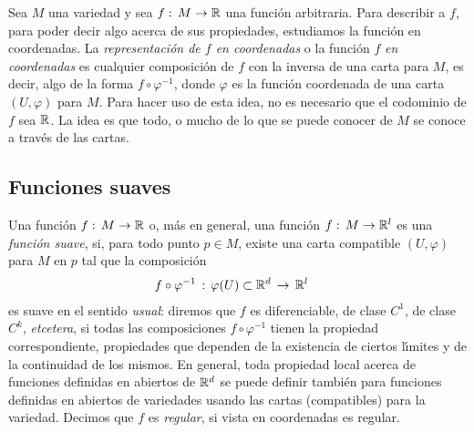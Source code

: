 \theoremstyle{plain}
\newtheorem{propoSuavidadEsLocal}{Proposici\'{o}n}[section]
\newtheorem{propoSuaveEsConti}[propoSuavidadEsLocal]{Proposici\'{o}n}
\newtheorem{propoDelPegado}[propoSuavidadEsLocal]{Proposici\'{o}n}
\newtheorem{propoAlgunasFuncionesSuaves}[propoSuavidadEsLocal]{Proposici\'{o}n}

\theoremstyle{remark}
\newtheorem{obsComoLaUsual}{Observaci\'{o}n}[section]
\newtheorem{obsTodasSonSuaves}[obsComoLaUsual]{Observaci\'{o}n}
\newtheorem{obsOtrasCaracterizacionesDeSuavidad}[obsComoLaUsual]%
	{Observaci\'{o}n}


Sea $M$ una variedad y sea $f:\,M\rightarrow\mathbb{R}$ una funci\'{o}n
arbitraria. Para describir a $f$, para poder decir algo acerca de sus
propiedades, estudiamos la funci\'{o}n en coordenadas. La
\emph{representaci\'{o}n de $f$ en coordenadas} o la funci\'{o}n $f$
\emph{en coordenadas} es cualquier composici\'{o}n de $f$ con la inversa de
una carta para $M$, es decir, algo de la forma $f\circ\varphi^{-1}$,
donde $\varphi$ es la funci\'{o}n coordenada de una carta $(U,\varphi)$
para $M$. Para hacer uso de esta idea, no es necesario que el codominio de
$f$ sea $\mathbb{R}$. La idea es que todo, o mucho de lo que se puede conocer de
$M$ se conoce a trav\'{e}s de las cartas.

\subsection{Funciones suaves}
Una funci\'{o}n $f:\,M\rightarrow\mathbb{R}$ o, m\'{a}s en general, una funci\'{o}n $f:\,M\rightarrow\mathbb{R}^{l}$ es una
\emph{funci\'{o}n suave}, si, para todo punto $p\in M$, existe una carta
compatible $(U,\varphi)$ para $M$ en $p$ tal que la composici\'{o}n
\begin{align*}
	f\circ\varphi^{-1} & \,:\,\varphi(U)\subset\mathbb{R}^{d}\,\rightarrow\,
					\mathbb{R}^{l}
\end{align*}
%
es suave en el sentido \emph{usual}: diremos que $f$ es diferenciable, de
clase $C^{1}$, de clase $C^{k}$, \textit{etcetera}, si todas las
composiciones $f\circ\varphi^{-1}$ tienen la propiedad correspondiente,
propiedades que dependen de la existencia de ciertos l\'{\i}mites y
de la continuidad de los mismos. En general, toda propiedad local acerca
de funciones definidas en abiertos de $\mathbb{R}^{d}$ se puede definir
tambi\'{e}n para funciones definidas en abiertos de variedades usando las
cartas (compatibles) para la variedad. Decimos que $f$ es \emph{regular},
si vista en coordenadas es regular.

